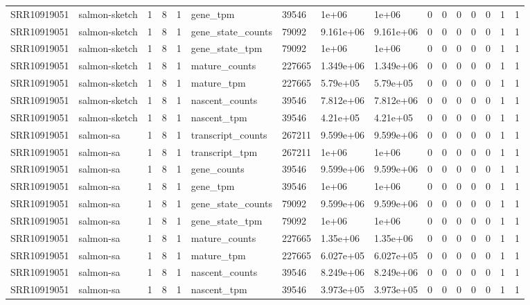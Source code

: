 \begin{tabular}{llllllllllllllll}
SRR10919051 & salmon-sketch & 1 & 8 & 1 & gene\_tpm & 39546 & 1e+06 & 1e+06 & 0 & 0 & 0 & 0 & 0 & 1 & 1 \\
SRR10919051 & salmon-sketch & 1 & 8 & 1 & gene\_state\_counts & 79092 & 9.161e+06 & 9.161e+06 & 0 & 0 & 0 & 0 & 0 & 1 & 1 \\
SRR10919051 & salmon-sketch & 1 & 8 & 1 & gene\_state\_tpm & 79092 & 1e+06 & 1e+06 & 0 & 0 & 0 & 0 & 0 & 1 & 1 \\
SRR10919051 & salmon-sketch & 1 & 8 & 1 & mature\_counts & 227665 & 1.349e+06 & 1.349e+06 & 0 & 0 & 0 & 0 & 0 & 1 & 1 \\
SRR10919051 & salmon-sketch & 1 & 8 & 1 & mature\_tpm & 227665 & 5.79e+05 & 5.79e+05 & 0 & 0 & 0 & 0 & 0 & 1 & 1 \\
SRR10919051 & salmon-sketch & 1 & 8 & 1 & nascent\_counts & 39546 & 7.812e+06 & 7.812e+06 & 0 & 0 & 0 & 0 & 0 & 1 & 1 \\
SRR10919051 & salmon-sketch & 1 & 8 & 1 & nascent\_tpm & 39546 & 4.21e+05 & 4.21e+05 & 0 & 0 & 0 & 0 & 0 & 1 & 1 \\
SRR10919051 & salmon-sa & 1 & 8 & 1 & transcript\_counts & 267211 & 9.599e+06 & 9.599e+06 & 0 & 0 & 0 & 0 & 0 & 1 & 1 \\
SRR10919051 & salmon-sa & 1 & 8 & 1 & transcript\_tpm & 267211 & 1e+06 & 1e+06 & 0 & 0 & 0 & 0 & 0 & 1 & 1 \\
SRR10919051 & salmon-sa & 1 & 8 & 1 & gene\_counts & 39546 & 9.599e+06 & 9.599e+06 & 0 & 0 & 0 & 0 & 0 & 1 & 1 \\
SRR10919051 & salmon-sa & 1 & 8 & 1 & gene\_tpm & 39546 & 1e+06 & 1e+06 & 0 & 0 & 0 & 0 & 0 & 1 & 1 \\
SRR10919051 & salmon-sa & 1 & 8 & 1 & gene\_state\_counts & 79092 & 9.599e+06 & 9.599e+06 & 0 & 0 & 0 & 0 & 0 & 1 & 1 \\
SRR10919051 & salmon-sa & 1 & 8 & 1 & gene\_state\_tpm & 79092 & 1e+06 & 1e+06 & 0 & 0 & 0 & 0 & 0 & 1 & 1 \\
SRR10919051 & salmon-sa & 1 & 8 & 1 & mature\_counts & 227665 & 1.35e+06 & 1.35e+06 & 0 & 0 & 0 & 0 & 0 & 1 & 1 \\
SRR10919051 & salmon-sa & 1 & 8 & 1 & mature\_tpm & 227665 & 6.027e+05 & 6.027e+05 & 0 & 0 & 0 & 0 & 0 & 1 & 1 \\
SRR10919051 & salmon-sa & 1 & 8 & 1 & nascent\_counts & 39546 & 8.249e+06 & 8.249e+06 & 0 & 0 & 0 & 0 & 0 & 1 & 1 \\
SRR10919051 & salmon-sa & 1 & 8 & 1 & nascent\_tpm & 39546 & 3.973e+05 & 3.973e+05 & 0 & 0 & 0 & 0 & 0 & 1 & 1 \\

\end{tabular}
